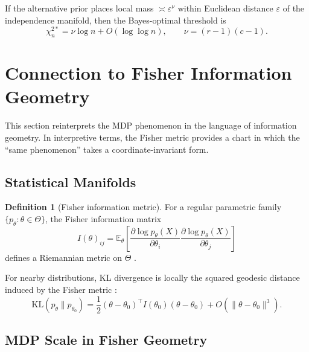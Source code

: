\documentclass[11pt]{article}
\newcommand{\KL}{\mathrm{KL}}
\newcommand{\1}{\mathbf{1}}
\newcommand{\EE}{\mathbb{E}}
\theoremstyle{plain}
\theoremstyle{definition}
\newtheorem{definition}[theorem]{Definition}
\theoremstyle{remark}
\begin{document}
If the alternative prior places local mass $\asymp \varepsilon^{\nu}$ within Euclidean distance $\varepsilon$ of the independence manifold, then the Bayes-optimal threshold is
\begin{equation}\label{eq:indep-logn}
\chi_n^{2*} = \nu\log n + O(\log\log n), \qquad \nu=(r-1)(c-1).
\end{equation}


\section{Connection to Fisher Information Geometry}
\label{sec:fisher}

This section reinterprets the MDP phenomenon in the language of information geometry. In interpretive terms, the Fisher metric provides a chart in which the ``same phenomenon'' takes a coordinate-invariant form.

\subsection{Statistical Manifolds}

\begin{definition}[Fisher information metric]\label{def:fisher-metric}
For a regular parametric family $\{p_\theta:\theta\in\Theta\}$, the Fisher information matrix
\begin{equation}\label{eq:fisher-matrix}
I(\theta)_{ij}
=
\EE_\theta\!\left[
\frac{\partial \log p_\theta(X)}{\partial \theta_i}
\frac{\partial \log p_\theta(X)}{\partial \theta_j}
\right]
\end{equation}
defines a Riemannian metric on $\Theta$ \citep[see][for historical context]{Zabell1992}.
\end{definition}

For nearby distributions, KL divergence is locally the squared geodesic distance induced by the Fisher metric \citep{DawidMusio2015}:
\begin{equation}\label{eq:kl-fisher}
\KL(p_\theta\|p_{\theta_0})
=
\frac{1}{2}(\theta-\theta_0)^\top I(\theta_0)(\theta-\theta_0)
+O(\|\theta-\theta_0\|^3).
\end{equation}


\subsection{MDP Scale in Fisher Geometry}
\end{document}
